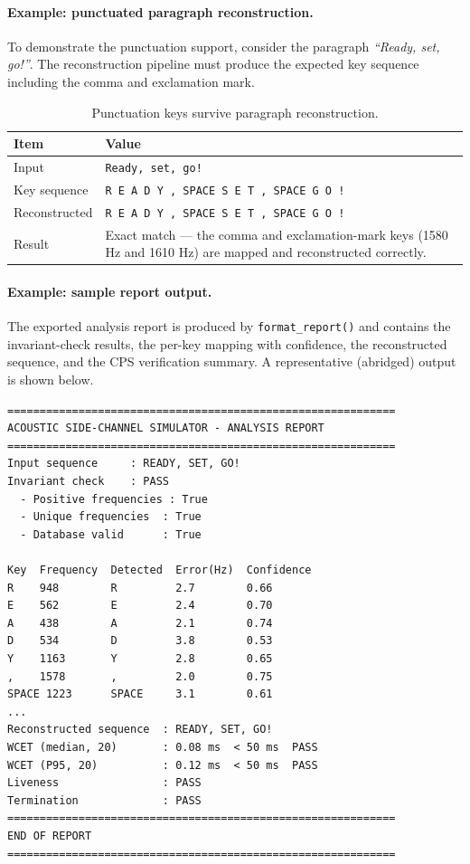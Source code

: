 \documentclass[11pt,a4paper]{article}
\begin{document}
\paragraph{Example: punctuated paragraph reconstruction.}
To demonstrate the punctuation support, consider the paragraph
\emph{``Ready, set, go!''}. The reconstruction pipeline must produce the
expected key sequence including the comma and exclamation mark.

\begin{table}[H]
    \centering
    \begin{tabular}{@{}lp{9.5cm}@{}}
        \toprule
        \textbf{Item} & \textbf{Value} \\
        \midrule
        Input & \texttt{Ready, set, go!} \\
        Key sequence & \texttt{R E A D Y , SPACE S E T , SPACE G O !} \\
        Reconstructed & \texttt{R E A D Y , SPACE S E T , SPACE G O !} \\
        Result & Exact match --- the comma and exclamation-mark keys
            (1580 Hz and 1610 Hz) are mapped and reconstructed correctly. \\
        \bottomrule
    \end{tabular}
    \caption{Punctuation keys survive paragraph reconstruction.}
    \label{tab:punctuation-example}
\end{table}

\paragraph{Example: sample report output.}
The exported analysis report is produced by \texttt{format\_report()} and
contains the invariant-check results, the per-key mapping with confidence, the
reconstructed sequence, and the CPS verification summary. A representative
(abridged) output is shown below.

\begin{lstlisting}[caption={Abridged analysis report output.}, label={lst:report}]
============================================================
ACOUSTIC SIDE-CHANNEL SIMULATOR - ANALYSIS REPORT
============================================================
Input sequence     : READY, SET, GO!
Invariant check    : PASS
  - Positive frequencies : True
  - Unique frequencies  : True
  - Database valid      : True

Key  Frequency  Detected  Error(Hz)  Confidence
R    948        R         2.7        0.66
E    562        E         2.4        0.70
A    438        A         2.1        0.74
D    534        D         3.8        0.53
Y    1163       Y         2.8        0.65
,    1578       ,         2.0        0.75
SPACE 1223      SPACE     3.1        0.61
...
Reconstructed sequence  : READY, SET, GO!
WCET (median, 20)       : 0.08 ms  < 50 ms  PASS
WCET (P95, 20)          : 0.12 ms  < 50 ms  PASS
Liveness                : PASS
Termination             : PASS
============================================================
END OF REPORT
============================================================
\end{lstlisting}
\end{document}
